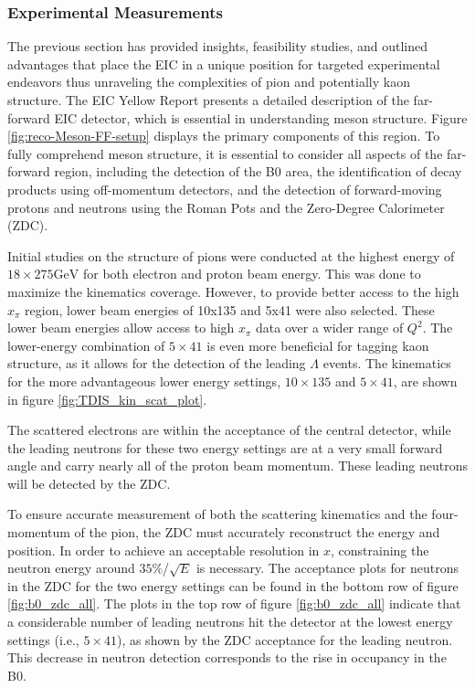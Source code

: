 \documentclass[
]{report}
\begin{document}
\hypertarget{experimental-measurements}{%
\subsubsection{Experimental
Measurements}\label{experimental-measurements}}



The previous section has provided insights, feasibility studies, and
outlined advantages that place the EIC in a unique position for targeted
experimental endeavors thus unraveling the complexities of pion and
potentially kaon structure. The EIC Yellow Report presents a detailed
description of the far-forward EIC detector, which is essential in
understanding meson structure. Figure \ref{fig:reco-Meson-FF-setup}
displays the primary components of this region. To fully comprehend
meson structure, it is essential to consider all aspects of the
far-forward region, including the detection of the B0 area, the
identification of decay products using off-momentum detectors, and the
detection of forward-moving protons and neutrons using the Roman Pots
and the Zero-Degree Calorimeter (ZDC).

Initial studies on the structure of pions were conducted at the highest
energy of \(18\times 275\mathrm{GeV}\) for both electron and proton beam
energy. This was done to maximize the kinematics coverage. However, to
provide better access to the high \(x_\pi\) region, lower beam energies
of 10x135 and 5x41 were also selected. These lower beam energies allow
access to high \(x_\pi\) data over a wider range of \(Q^2\). The
lower-energy combination of \(5\times41\) is even more beneficial for
tagging kaon structure, as it allows for the detection of the leading
\(\Lambda\) events. The kinematics for the more advantageous lower
energy settings, \(10\times 135\) and \(5\times 41\), are shown in
figure \ref{fig:TDIS_kin_scat_plot}.



The scattered electrons are within the acceptance of the central
detector, while the leading neutrons for these two energy settings are
at a very small forward angle and carry nearly all of the proton beam
momentum. These leading neutrons will be detected by the ZDC.



To ensure accurate measurement of both the scattering kinematics and the
four-momentum of the pion, the ZDC must accurately reconstruct the
energy and position. In order to achieve an acceptable resolution in
\(x\), constraining the neutron energy around \(35\%\)/\(\sqrt{E}\) is
necessary. The acceptance plots for neutrons in the ZDC for the two
energy settings can be found in the bottom row of figure
\ref{fig:b0_zdc_all}. The plots in the top row of figure
\ref{fig:b0_zdc_all} indicate that a considerable number of leading
neutrons hit the detector at the lowest energy settings (i.e.,
\(5\times41\)), as shown by the ZDC acceptance for the leading neutron.
This decrease in neutron detection corresponds to the rise in occupancy
in the B0.
\end{document}
